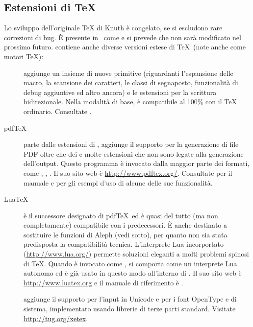 \documentclass{article}
\begin{document}
\subsection{Estensioni di \protect\TeX}
\label{sec:tex-extensions}

Lo sviluppo dell'originale \TeX{} di Knuth è congelato, se si escludono
rare correzioni di bug. È presente in \TL\ come  e si prevede
che non sarà modificato nel prossimo futuro. 
\TL{} contiene anche diverse versioni estese
di \TeX\ (note anche come motori \TeX):

\begin{description}

\item [\eTeX] aggiunge un insieme di nuove primitive \label{text:etex}
(riguardanti l'espansione delle macro, la scansione dei caratteri, le
classi di segnaposto, funzionalità di debug aggiuntive ed altro ancora)
e le estensioni \TeXXeT{} per la scrittura bidirezionale. Nella modalità
di base, \eTeX{} è compatibile al 100\% con il \TeX{} ordinario.
Consultate .

\item [pdf\TeX] parte dalle estensioni di \eTeX, aggiunge il supporto per
la generazione di file PDF oltre che dei \dvi{} e molte estensioni
che non sono legate alla generazione dell'output. Questo programma è
invocato dalla maggior parte dei formati, come , ,
. Il suo sito web è \url{http://www.pdftex.org/}.
Consultate  per il manuale
e  per gli
esempi d'uso di alcune delle sue funzionalità.

\item [Lua\TeX] è il successore designato di pdf\TeX\ ed è quasi del tutto
(ma non completamente) compatibile con i predecessori. È anche destinato a
sostituire le funzioni di Aleph (vedi sotto), per quanto non sia stata
predisposta la compatibilità tecnica. L'interprete Lua incorportato
(\url{http://www.lua.org/}) permette soluzioni eleganti a molti problemi
spinosi di \TeX. Quando è invocato come , si comporta
come un interprete Lua autonomo ed è già usato in questo modo all'interno
di \TL. Il suo sito web è \url{http://www.luatex.org} e il manuale di
riferimento è .

\item [\XeTeX] aggiunge il supporto per l'input in Unicode e per i font
OpenType e di sistema, implementato usando librerie di terze parti
standard. Visitate \url{http://tug.org/xetex}.


\end{description}
\end{document}
